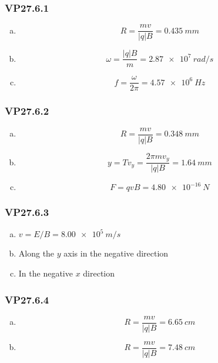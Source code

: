 \documentclass{article}
\begin{document}
\subsubsection{VP27.6.1}

\begin{enumerate}[(a)]
  \item \[R = \frac{m v}{|q| B} = \qty{0.435}{mm}\]

  \item \[\omega = \frac{|q| B}{m} = \qty{2.87e7}{rad/s}\]

  \item \[f = \frac{\omega}{2 \pi} = \qty{4.57e6}{Hz}\]
\end{enumerate}

\subsubsection{VP27.6.2}

\begin{enumerate}[(a)]
  \item \[R = \frac{m v}{|q| B} = \qty{0.348}{mm}\]

  \item \[y = T v_y = \frac{2 \pi m v_y}{|q| B} = \qty{1.64}{mm}\]

  \item \[F = q v B = \qty{4.80e-16}{N}\]
\end{enumerate}

\subsubsection{VP27.6.3}

\begin{enumerate}[(a)]
  \item $v = E / B = \qty{8.00e5}{m/s}$

  \item Along the $y$ axis in the negative direction

  \item In the negative $x$ direction
\end{enumerate}

\subsubsection{VP27.6.4}

\begin{enumerate}[(a)]
  \item \[R = \frac{m v}{|q| B} = \qty{6.65}{cm}\]

  \item \[R = \frac{m v}{|q| B} = \qty{7.48}{cm}\]
\end{enumerate}
\end{document}
